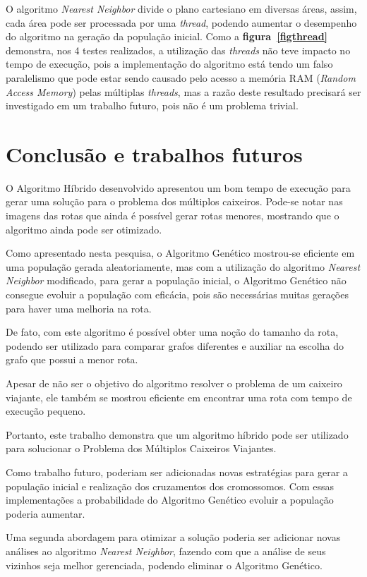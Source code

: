 \documentclass[12pt,openright,a4paper,twoside]{tcc}
\begin{document}
            O algoritmo \textit{Nearest Neighbor} divide o plano cartesiano em diversas áreas, assim, cada área pode ser processada por uma \textit{thread}, podendo aumentar o desempenho do algoritmo na geração da população inicial. Como a \textbf{figura~\ref{figthread}} demonstra, nos 4 testes realizados, a utilização das \textit{threads} não teve impacto no tempo de execução, pois a implementação do algoritmo está tendo um falso paralelismo que pode estar sendo causado pelo acesso a memória RAM (\textit{Random Access Memory}) pelas múltiplas \textit{threads}, mas a razão deste resultado precisará ser investigado em um trabalho futuro, pois não é um problema trivial.  


	\chapter{Conclusão e trabalhos futuros}
		
	O Algoritmo Híbrido desenvolvido apresentou um bom tempo de execução para gerar uma solução para o problema dos múltiplos caixeiros. Pode-se notar nas imagens das rotas que ainda é possível gerar rotas menores, mostrando que o algoritmo ainda pode ser otimizado.

    Como apresentado nesta pesquisa, o Algoritmo Genético mostrou-se eficiente em uma população gerada aleatoriamente, mas com a utilização do algoritmo \textit{Nearest Neighbor} modificado, para gerar a população inicial, o Algoritmo Genético não consegue evoluir a população com eficácia, pois são necessárias muitas gerações para haver uma melhoria na rota.

    De fato, com este algoritmo é possível obter uma noção do tamanho da rota, podendo ser utilizado para comparar grafos diferentes e auxiliar na escolha do grafo que possui a menor rota.

    Apesar de não ser o objetivo do algoritmo resolver o problema de um caixeiro viajante, ele também se mostrou eficiente em encontrar uma rota com tempo de execução pequeno.

    Portanto, este trabalho demonstra que um algoritmo híbrido pode ser utilizado para solucionar o Problema dos Múltiplos Caixeiros Viajantes.  

    Como trabalho futuro, poderiam ser adicionadas novas estratégias para gerar a população inicial e realização dos cruzamentos dos cromossomos. Com essas implementações a probabilidade do Algoritmo Genético evoluir a população poderia aumentar.

    Uma segunda abordagem para otimizar a solução poderia ser adicionar novas análises ao algoritmo \textit{Nearest Neighbor}, fazendo com que a análise de seus vizinhos seja melhor gerenciada, podendo eliminar o Algoritmo Genético.
\end{document}
